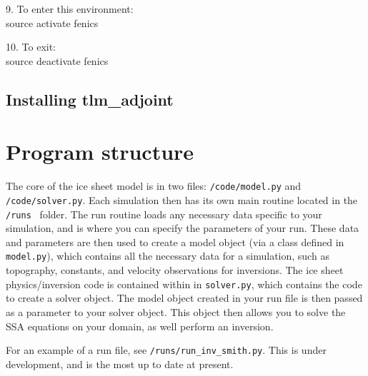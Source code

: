 \documentclass[11pt, reqno, nocenter]{article}
\begin{document}
9. To enter this environment: \\
source activate fenics

10. To exit: \\
source deactivate fenics

\subsection{Installing tlm\_adjoint}

\section{Program structure}

The core of the ice sheet model is in two files: {\tt /code/model.py} and {\tt /code/solver.py}. Each simulation then has its own main routine located in the {\tt /runs } folder. The run routine loads any necessary data specific to your simulation, and is where you can specify the parameters of your run. These data and parameters are then used to create a model object (via a class defined in {\tt model.py}), which contains all the necessary data for a simulation, such as topography, constants, and velocity observations for inversions. The ice sheet physics/inversion code is contained within in {\tt solver.py}, which contains the code to create a solver object. The model object created in your run file is then passed as a parameter to your solver object. This object then allows you to solve the SSA equations on your domain, as well perform an inversion. 

For an example of a run file, see {\tt /runs/run\_inv\_smith.py}. This is under development, and is the most up to date at present.
\end{document}
